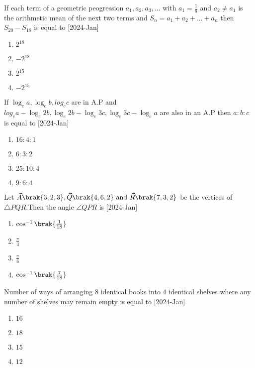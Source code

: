 \item If each term of a geometric peogression $a_1 , a_2 , a_3 ,\dots $ with $a_1 = \frac{1}{8}$ and $a_2 \neq a_1 $ is the arithmetic mean of the next two terms and $S_n = a_1 + a_2 + \dots + a_n$ then $S_{20} - S_{18}$ is equal to \hfill[2024-Jan]
	\begin{multicols}{2}
		\begin{enumerate}
			\item $2^{18}$
			\item $-2^{18}$
			\item $2^{15}$
			\item $-2^{15}$
		\end{enumerate}
	\end{multicols}
	\item If $\log_e a , \log_e b , log_e c $ are in A.P and $log_e{a} - \log_e{2b} , \log_e{2b} - \log_e{3c} , \log_e{3c} - \log_e{a}$ are also in an A.P then $a \colon b \colon c$ is equal to \hfill[2024-Jan]
	\begin{enumerate}
		\item $16 \colon 4 \colon 1$
		\item $6 \colon 3 \colon 2$
		\item $25 \colon 10 \colon 4$
		\item $9 \colon 6 \colon 4$\\
	\end{enumerate}
\item Let $\vec{A} \brak{ 3 , 2 ,3} , \vec{Q}\brak{4 , 6 ,2} \text{ and } \vec{R}\brak{ 7 , 3 ,2}$ be the vertices of $\triangle {PQR}$.Then the angle $\angle{QPR}$ is \hfill[2024-Jan]
	\begin{enumerate}
		\item $\cos ^{-1}\brak{\frac{1}{18}}$
		\item $\frac{\pi}{3}$
		\item $\frac{\pi}{6}$
		\item $\cos^{-1}\brak{\frac{7}{18}}$
	\end{enumerate}
\item Number of ways of arranging $8$ identical books into $4$ identical shelves where any number of shelves may remain empty is equal to \hfill[2024-Jan]
	\begin{multicols}{2}
		\begin{enumerate}
			\item $16$
			\item $18$
			\item $15$
			\item $12$
		\end{enumerate}
	\end{multicols}
